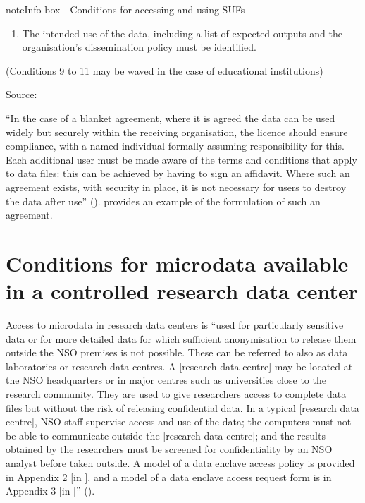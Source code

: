 \documentclass[letterpaper,10pt,english]{sphinxmanual}
\begin{document}
\begin{sphinxadmonition}{note}{Info-box - Conditions for accessing and using SUFs}
\begin{enumerate}
\item {} 
The intended use of the data, including a list of expected outputs and the organisation’s dissemination policy must be identified.

\end{enumerate}

(Conditions 9 to 11 may be waved in the case of educational institutions)

Source: {\hyperref[\detokenize{release_types:dubo10}]{}}
\end{sphinxadmonition}


“In the case of a blanket agreement, where it is agreed the data can be
used widely but securely within the receiving organisation, the licence
should ensure compliance, with a named individual formally assuming
responsibility for this. Each additional user must be made aware of the
terms and conditions that apply to data files: this can be achieved by
having to sign an affidavit. Where such an agreement exists, with
security in place, it is not necessary for users to destroy the data
after use” ({\hyperref[\detokenize{release_types:dubo10}]{}}).
provides an example of the formulation of such an agreement.


\section{Conditions for microdata available in a controlled research data center}
\label{\detokenize{release_types:conditions-for-microdata-available-in-a-controlled-research-data-center}}
Access to microdata in research data centers is “used for particularly
sensitive data or for more detailed data for which sufficient
anonymisation to release them outside the NSO premises is not possible.
These can be referred to also as data laboratories or research data
centres. A {[}research data centre{]} may be located at the NSO headquarters
or in major centres such as universities close to the research
community. They are used to give researchers access to complete data
files but without the risk of releasing confidential data. In a typical
{[}research data centre{]}, NSO staff supervise access and use of the data;
the computers must not be able to communicate outside the {[}research data
centre{]}; and the results obtained by the researchers must be screened
for confidentiality by an NSO analyst before taken outside. A model of a
data enclave access policy is provided in Appendix 2 {[}in {\hyperref[\detokenize{release_types:dubo10}]{}}{]},
and a model of a data enclave access request form is in
Appendix 3 {[}in {\hyperref[\detokenize{release_types:dubo10}]{}}{]}” ({\hyperref[\detokenize{release_types:dubo10}]{}}).
\end{document}
